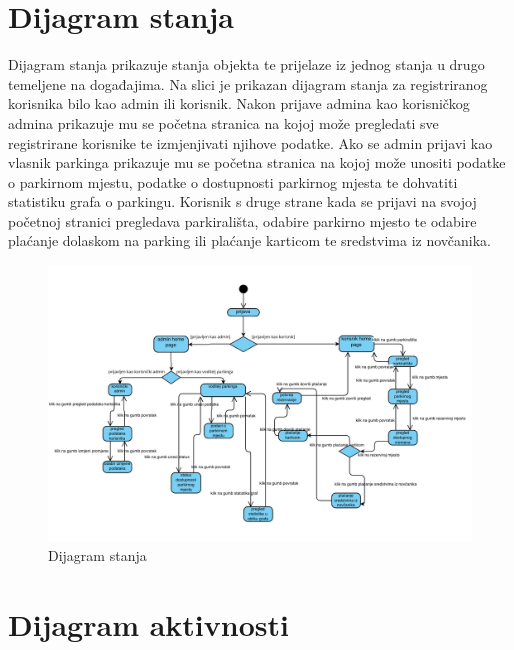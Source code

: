 		
			
			\pagebreak
		
		\section{Dijagram stanja}
			
			
			
			{Dijagram stanja prikazuje stanja objekta te prijelaze iz jednog stanja u drugo temeljene na događajima. Na slici je prikazan dijagram stanja za registriranog korisnika bilo kao admin ili korisnik. Nakon prijave admina kao korisničkog admina prikazuje mu se početna stranica na kojoj može pregledati sve registrirane korisnike te izmjenjivati njihove podatke. Ako se admin prijavi kao vlasnik parkinga prikazuje mu se početna stranica na kojoj može unositi podatke o parkirnom mjestu, podatke o dostupnosti parkirnog mjesta te dohvatiti statistiku grafa o parkingu. Korisnik s druge strane kada se prijavi na svojoj početnoj stranici pregledava parkirališta, odabire parkirno mjesto te odabire plaćanje dolaskom na parking ili plaćanje karticom te sredstvima iz novčanika. }
			
		
			\begin{figure}[h]
				\centering
				\includegraphics[width=\textwidth,keepaspectratio]{slike/DijagramStanjacopyy.png}
				\caption{Dijagram stanja}
				\label{fig:DijagramStanjacopyy}
			\end{figure}
			
			
			
			\eject 
		
		\section{Dijagram aktivnosti}
			
